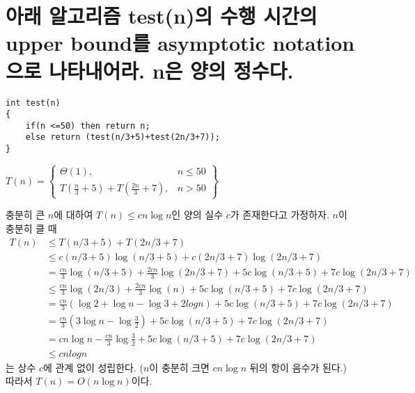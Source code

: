 \documentclass{article}
\begin{document}
\section{아래 알고리즘 test(n)의 수행 시간의 upper bound를 asymptotic notation으로 나타내어라. n은 양의 정수다.}
\begin{lstlisting}
int test(n)
{
    if(n <=50) then return n;
    else return (test(n/3+5)+test(2n/3+7)); 
}
\end{lstlisting}

$
T(n) = \left\{\begin{array}{lr}
    \Theta(1), &  n \le 50\\
    T(\frac n3 + 5) + T(\frac{2n}3+7), &  n > 50
    \end{array}\right\}
$

충분히 큰 $n$에 대하여 $T(n) \le cn\log n$인 양의 실수 $c$가 존재한다고 가정하자. $n$이 충분히 클 때
\begin{align*}
    T(n) &\le T(n/3 + 5) + T(2n/3+7) \\
         &\le c(n/3+5)\log(n/3+5)+ c(2n/3+7)\log(2n/3+7)  \\
         &= \frac{cn}{3}\log(n/3+5) + \frac{2cn}{3}\log(2n/3+7) + 5c\log(n/3+5) + 7c\log(2n/3+7) \\ 
         &\le \frac{cn}{3}\log(2n/3) + \frac{2cn}{3}\log(n) + 5c\log(n/3+5) + 7c\log(2n/3+7) \\
         &=\frac{cn}{3}(\log2 + \log n - \log 3 +2 log n) + 5c\log(n/3+5) + 7c\log(2n/3+7)\\
         &=\frac{cn}{3}(3\log n - \log \frac{3}{2}) + 5c\log(n/3+5) + 7c\log(2n/3+7) \\
         &=cn\log n - \frac{cn}{3}\log \frac{3}{2} + 5c\log(n/3+5) + 7c\log(2n/3+7) \\
         & \le cn log n
\end{align*}
는 상수 $c$에 관계 없이 성립한다. ($n$이 충분히 크면 $cn \log n$ 뒤의 항이 음수가 된다.) 따라서 $T(n) = O(n\log n)$이다.
\end{document}
